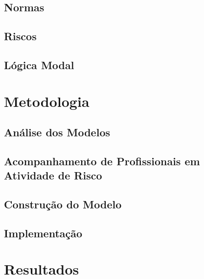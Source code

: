 \documentclass[openright]{normas-utf-tex} %
\begin{document}
	\section{Normas}

		


	\section{Riscos}

		

	\section{Lógica Modal}

		


\chapter{Metodologia}
\label{chap:metod}

	

	\section{Análise dos Modelos}

		

	\section{Acompanhamento de Profissionais em Atividade de Risco}

		

	\section{Construção do Modelo}

		

	\section{Implementação}

		

\chapter{Resultados}
\label{chap:resul}
\end{document}
